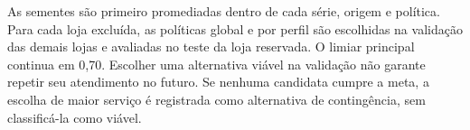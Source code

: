 As sementes são primeiro promediadas dentro de cada série, origem e política. Para cada loja excluída, as políticas global e por perfil são escolhidas na validação das demais lojas e avaliadas no teste da loja reservada. O limiar principal continua em 0,70. Escolher uma alternativa viável na validação não garante repetir seu atendimento no futuro. Se nenhuma candidata cumpre a meta, a escolha de maior serviço é registrada como alternativa de contingência, sem classificá-la como viável.

